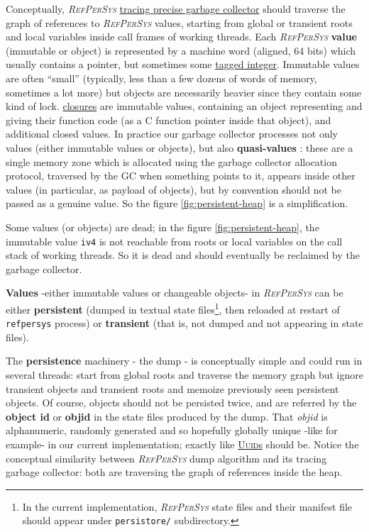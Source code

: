 \documentclass[11pt,a4paper,svgnames]{article}
\newcommand{\RefPerSys}{{\textit{\textsc{RefPerSys}}}}
\begin{document}
Conceptually, {\RefPerSys}
\href{https://en.wikipedia.org/wiki/Tracing_garbage_collection}{tracing
  precise garbage collector} should traverse the graph of references
to {\RefPerSys} values, starting from global or transient roots and
local variables inside call frames of working threads. Each
{\RefPerSys} \textbf{value}  (immutable or object) is
represented by a machine word (aligned, 64 bits) which usually
contains a pointer, but sometimes some
\href{https://en.wikipedia.org/wiki/Tagged\_pointer}{tagged integer}.
Immutable values are often ``small'' (typically, less than a few dozens of words of memory, sometimes a lot more) but
objects are necessarily heavier since they contain some kind of
lock. \href{https://en.wikipedia.org/wiki/Closure\_(computer_programming)}{closures}
are immutable values, containing an object representing and giving
their function code (as a C function pointer inside that object), and
additional closed values. In practice our garbage collector processes
not only values (either immutable values or objects), but also
\textbf{quasi-values} : these are a single memory
zone which is allocated using the garbage collector allocation
protocol, traversed by the GC when something points to it, appears
inside other values (in particular, as payload  of objects), but by
convention should not be passed as a genuine value. So the figure
\ref{fig:persistent-heap} is a simplification.

Some values (or objects) are dead; in the figure
\ref{fig:persistent-heap}, the immutable value \texttt{iv4} is not
reachable from roots or local variables on the call stack of working
threads. So it is dead and should eventually be reclaimed by the
garbage collector.

\textbf{Values} -either immutable values or changeable objects- in
{\RefPerSys} can be either \textbf{persistent} (dumped in
textual state files\footnote{In the current implementation,
{\RefPerSys} state files and their manifest file should appear
under \texttt{persistore/} subdirectory.}, then reloaded at
restart of \texttt{refpersys} process) or \textbf{transient}
(that is, not dumped and not appearing in state files).

The \textbf{persistence} machinery - the dump - is conceptually simple
and could run in several threads: start from global roots and traverse
the memory graph but ignore transient objects and transient roots and
memoize previously seen persistent objects. Of course, objects should
not be persisted twice, and are referred by the \textbf{object id} or
\textbf{objid} in the state files produced by the dump. That
\textit{objid}  is alphanumeric, randomly generated and so hopefully
globally unique -like {}
for example- in our current implementation; exactly like
\href{https://en.wikipedia.org/wiki/Universally_unique_identifier}{\textsc{Uuid}s}
should be. Notice the conceptual similarity between {\RefPerSys} dump
algorithm and its tracing garbage collector: both are traversing the
graph of references inside the heap.
\end{document}
